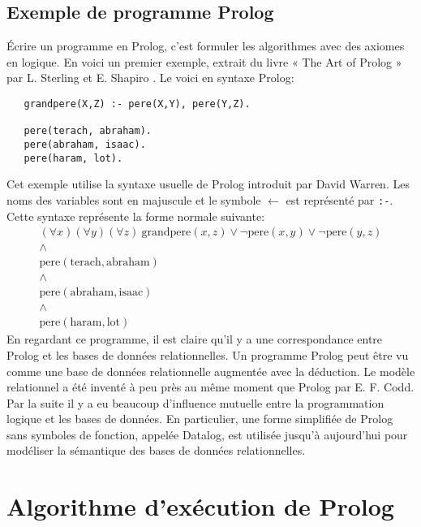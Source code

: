 \subsection{Exemple de programme Prolog}

Écrire un programme en Prolog, c'est formuler les algorithmes avec des axiomes en logique.
En voici un premier exemple, extrait du livre « The Art of Prolog » par L. Sterling et E. Shapiro \cite{pro}.
Le voici en syntaxe Prolog:
\begin{verbatim}
   grandpere(X,Z) :- pere(X,Y), pere(Y,Z).

   pere(terach, abraham).
   pere(abraham, isaac).
   pere(haram, lot).
\end{verbatim}
Cet exemple utilise la syntaxe usuelle de Prolog introduit par David Warren.
Les noms des variables sont en majuscule et
le symbole $\leftarrow$ est représenté par \verb+:-+.
Cette syntaxe représente la forme normale suivante:
\begin{equation}
\begin{array}{l}
(\forall x) (\forall y) (\forall z)\ \mathrm{grandpere}(x,z) \vee \neg \mathrm{pere}(x,y) \vee \neg \mathrm{pere}(y,z) \\
\wedge \\
\mathrm{pere}(\mathrm{terach},\mathrm{abraham}) \\
\wedge \\
\mathrm{pere}(\mathrm{abraham},\mathrm{isaac}) \\
\wedge \\
\mathrm{pere}(\mathrm{haram},\mathrm{lot})
\end{array}
\end{equation}
En regardant ce programme, il est claire qu'il y a une correspondance entre Prolog et les bases de données relationnelles.
Un programme Prolog peut être vu comme une base de données relationnelle augmentée avec la déduction.
Le modèle relationnel a été inventé à peu près au même moment que Prolog par E. F. Codd.
Par la suite
il y a eu beaucoup d'influence mutuelle entre la programmation logique et les bases de données.
En particulier, une forme simplifiée de Prolog sans symboles de fonction, appelée Datalog,
est utilisée jusqu'à aujourd'hui pour modéliser la sémantique
des bases de données relationnelles.

\section{Algorithme d'exécution de Prolog}

